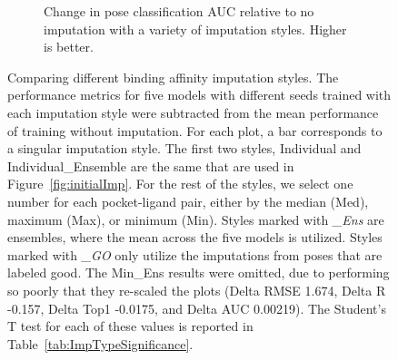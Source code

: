 \documentclass[journal=jmcmar,manuscript=article]{achemso}
\begin{document}
\begin{figure}[tbph]
\begin{subfigure}[t]{0.48\textwidth}
        \caption{Change in pose classification AUC relative to no imputation with a variety of imputation styles. Higher is better.}
    \end{subfigure}
    \caption{Comparing different binding affinity imputation styles. The performance metrics for five models with different seeds trained with each imputation style were subtracted from the mean performance of training without imputation. For each plot, a bar corresponds to a singular imputation style. The first two styles, Individual and Individual\_Ensemble are the same that are used in Figure~\ref{fig:initialImp}. For the rest of the styles, we select one number for each pocket-ligand pair, either by the median (Med), maximum (Max), or minimum (Min). Styles marked with \textit{\_Ens} are ensembles, where the mean across the five models is utilized. Styles marked with \textit{\_GO} only utilize the imputations from poses that are labeled good. The Min\_Ens results were omitted, due to performing so poorly that they re-scaled the plots (Delta RMSE 1.674, Delta R -0.157, Delta Top1 -0.0175, and Delta AUC 0.00219). The Student's T test for each of these values is reported in Table~\ref{tab:ImpTypeSignificance}.}
    \label{fig:compareImp}
\end{figure}
\end{document}
